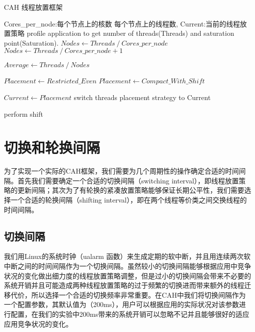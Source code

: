 \begin{algorithm}
\caption{CAH 线程放置框架}
\label{algo:mss}
\begin{algorithmic}[1] %
\Require Cores\_per\_node:每个节点上的核数 每个节点上的线程数, Current:当前的线程放置策略 %
\Repeat
{}
\State profile application to get number of threads(Threads) and saturation point(Saturation).
    \State $Nodes \gets Threads\  / \ Cores\_per\_node$
\Else
    \State $Nodes \gets Threads\  / \ Cores\_per\_node + 1$
\EndIf

\State $Average \gets Threads\  / \ Nodes$

    \State $Placement \gets Restricted\_Even$
\Else
    \State $Placement \gets Compact\_With\_Shift$
\EndIf

    \State $Current \gets Placement$
    \State switch threads placement strategy to Current 
\EndIf

    \State perform shift
\EndIf

\end{algorithmic}
\end{algorithm}

\section{切换和轮换间隔}
为了实现一个实际的CAH框架，我们需要为几个周期性的操作确定合适的时间间隔。首先我们需要确定一个合适的切换间隔（switching interval），即线程放置策略的更新间隔；其次为了有轮换的紧凑放置策略能够保证长期公平性，我们需要选择一个合适的轮换间隔（shifting interval），即在两个线程等价类之间交换线程的时间间隔。

\subsection{切换间隔}
我们用Linux的系统时钟（ualarm 函数）来生成定期的软中断，并且用连续两次软中断之间的时间间隔作为一个切换间隔。虽然较小的切换间隔能够根据应用中竞争状况的变化做出细力度的线程放置策略调整，但是过小的切换间隔会带来不必要的系统开销并且可能造成两种线程放置策略的过于频繁的切换进而带来额外的线程迁移代价，所以选择一个合适的切换频率非常重要。在CAH中我们将切换间隔作为一个配置参数，其默认值为（200ms），用户可以根据应用的实际状况对该参数进行配置，在我们的实验中200ms带来的系统开销可以忽略不记并且能够很好的适应应用竞争状况的变化。

